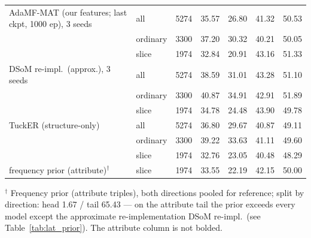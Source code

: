 \begin{table}[t]
\begin{tabular}{l l r r r r r}
\midrule
AdaMF-MAT (our features; last ckpt, 1000 ep), 3 seeds & all & 5274 & 35.57 & 26.80 & 41.32 & 50.53 \\
 & ordinary & 3300 & 37.20 & 30.32 & 40.21 & 50.05 \\
 & slice & 1974 & 32.84 & 20.91 & 43.16 & 51.33 \\
\midrule
DSoM re-impl.\ (approx.), 3 seeds & all & 5274 & 38.59 & 31.01 & 43.28 & 51.10 \\
 & ordinary & 3300 & 40.87 & 34.91 & 42.91 & 51.89 \\
 & slice & 1974 & 34.78 & 24.48 & 43.90 & 49.78 \\
\midrule
TuckER (structure-only) & all & 5274 & 36.80 & 29.67 & 40.87 & 49.11 \\
 & ordinary & 3300 & 39.22 & 33.63 & 41.11 & 49.60 \\
 & slice & 1974 & 32.76 & 23.05 & 40.48 & 48.29 \\
\midrule
frequency prior (attribute)$^\dagger$ & slice & 1974 & 33.55 & 22.19 & 42.15 & 50.00 \\
\bottomrule
\end{tabular}
\vspace{2pt}
\begin{minipage}{\linewidth}\footnotesize\raggedright
$^\dagger$ Frequency prior (attribute triples), both directions pooled for reference; split by direction: head 1.67 / tail 65.43 --- on the attribute tail the prior exceeds every model except the approximate re-implementation DSoM re-impl.\ (see Table~\ref{tab:lat_prior}). The attribute column is not bolded.
\end{minipage}
\end{table}
